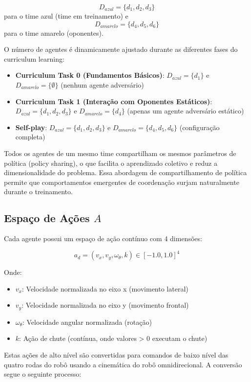 $$D_{azul} = \{d_1, d_2, d_3\}$$ para o time azul (time em treinamento) e $$D_{amarelo} = \{d_4, d_5, d_6\}$$ para o time amarelo (oponentes).

O número de agentes é dinamicamente ajustado durante as diferentes fases do curriculum learning:

\begin{itemize}
    \item \textbf{Curriculum Task 0 (Fundamentos Básicos)}: $D_{azul} = \{d_1\}$ e $D_{amarelo} = \{\emptyset\}$ (nenhum agente adversário)
    \item \textbf{Curriculum Task 1 (Interação com Oponentes Estáticos)}: $D_{azul} = \{d_1, d_2, d_3\}$ e $D_{amarelo} = \{d_4\}$ (apenas um agente adversário estático)
    \item \textbf{Self-play}: $D_{azul} = \{d_1, d_2, d_3\}$ e $D_{amarelo} = \{d_4, d_5, d_6\}$ (configuração completa)
\end{itemize}

Todos os agentes de um mesmo time compartilham os mesmos parâmetros de política (policy sharing), o que facilita o aprendizado coletivo e reduz a dimensionalidade do problema. Essa abordagem de compartilhamento de política permite que comportamentos emergentes de coordenação surjam naturalmente durante o treinamento.

\subsection{Espaço de Ações $A$}

Cada agente possui um espaço de ação contínuo com 4 dimensões:

$$a_d = (v_x, v_y, \omega_{\theta}, k) \in [-1.0, 1.0]^4$$

Onde:
\begin{itemize}
    \item $v_x$: Velocidade normalizada no eixo x (movimento lateral)
    \item $v_y$: Velocidade normalizada no eixo y (movimento frontal)
    \item $\omega_{\theta}$: Velocidade angular normalizada (rotação)
    \item $k$: Ação de chute (contínua, onde valores > 0 executam o chute)
\end{itemize}

Estas ações de alto nível são convertidas para comandos de baixo nível das quatro rodas do robô usando a cinemática do robô omnidirecional. A conversão segue o seguinte processo:

